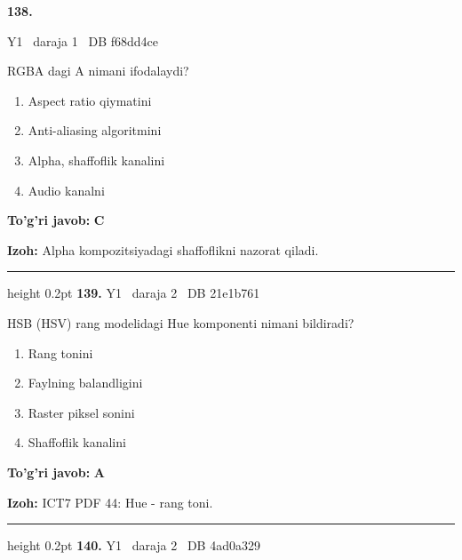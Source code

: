 \documentclass[10pt,a4paper,oneside]{article}
\begin{document}
\hypertarget{q138}{\textbf{\color{ink}138.}}  {\color{muted}\scriptsize Y1 \textbullet\ daraja 1 \textbullet\ DB f68dd4ce}
\par
RGBA dagi A nimani ifodalaydi?
\begin{enumerate}[label=\Alph*),leftmargin=9mm]
\item Aspect ratio qiymatini
\item Anti-aliasing algoritmini
\item Alpha, shaffoflik kanalini
\item Audio kanalni
\end{enumerate}
\begin{tcolorbox}[enhanced,breakable,colback=teal!4,colframe=teal!45!black,boxrule=0.45pt,arc=1.2mm,left=2.8mm,right=2.8mm,top=2mm,bottom=2mm,before skip=2mm,after skip=2mm]
\textbf{\color{teal}To'g'ri javob:} \textbf{C}
\par\smallskip
\textbf{Izoh:} Alpha kompozitsiyadagi shaffoflikni nazorat qiladi.
\end{tcolorbox}
\vspace{2mm}\hrule height 0.2pt \vspace{4mm}
\hypertarget{q139}{\textbf{\color{ink}139.}}  {\color{muted}\scriptsize Y1 \textbullet\ daraja 2 \textbullet\ DB 21e1b761}
\par
HSB (HSV) rang modelidagi Hue komponenti nimani bildiradi?
\begin{enumerate}[label=\Alph*),leftmargin=9mm]
\item Rang tonini
\item Faylning balandligini
\item Raster piksel sonini
\item Shaffoflik kanalini
\end{enumerate}
\begin{tcolorbox}[enhanced,breakable,colback=teal!4,colframe=teal!45!black,boxrule=0.45pt,arc=1.2mm,left=2.8mm,right=2.8mm,top=2mm,bottom=2mm,before skip=2mm,after skip=2mm]
\textbf{\color{teal}To'g'ri javob:} \textbf{A}
\par\smallskip
\textbf{Izoh:} ICT7 PDF 44: Hue - rang toni.
\end{tcolorbox}
\vspace{2mm}\hrule height 0.2pt \vspace{4mm}
\hypertarget{q140}{\textbf{\color{ink}140.}}  {\color{muted}\scriptsize Y1 \textbullet\ daraja 2 \textbullet\ DB 4ad0a329}
\par
\end{document}
